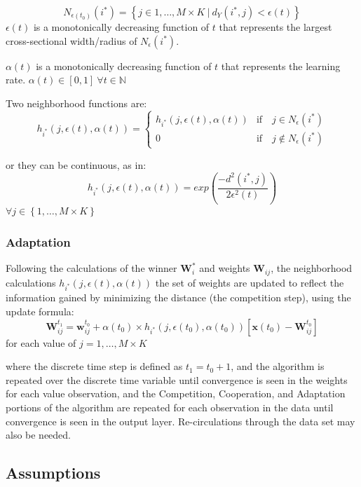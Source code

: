 \documentclass[12pt,]{article}
\begin{document}
\[N_{\epsilon(t_{0})}(i^{*})=\left \{ j \in 1, \ldots, M \times K \ | \  d_{Y}(i^{*}, j)<\epsilon(t) \right \}\]
\(\epsilon(t)\) is a monotonically decreasing function of \(t\) that
represents the largest cross-sectional width/radius of
\(N_{\epsilon}(i^{*})\).

\(\alpha(t)\) is a monotonically decreasing function of \(t\) that
represents the learning rate.
\(\alpha(t) \in [0,1] \ \forall t\in \mathbb{N}\)

Two neighborhood functions are: \[
h_{i^{*}}(j, \epsilon(t), \alpha(t))=
\begin{cases}
  h_{i^{*}}(j, \epsilon(t), \alpha(t)) & \text{if}  \quad j \in N_{\epsilon}(i^{*}) \\ 
  0 & \text{if} \quad   j  \notin N_{\epsilon}(i^{*}) 
\end{cases}
\]

or they can be continuous, as in:
\[h_{i^{*}}(j, \epsilon(t), \alpha(t)) = exp \left( \frac{-d^{2}(i^{*}, j)}{2\epsilon^{2}(t)} \right) \]
\(\forall j \in \left \{ 1, \ldots,M \times K\right \}\)

\hypertarget{adaptation}{%
\subsubsection{Adaptation}\label{adaptation}}

Following the calculations of the winner \(\mathbf{W}_{i}^{*}\) and
weights \(\mathbf{W}_{ij}\), the neighborhood calculations
\(h_{i^{*}}(j, \epsilon(t), \alpha(t))\) the set of weights are updated
to reflect the information gained by minimizing the distance (the
competition step), using the update formula:
\[\mathbf{W}_{ij}^{t_{1}} = \mathbf{w}_{ij}^{t_{0}} + \alpha(t_{0}) \times  h_{i^{*}}(j, \epsilon(t_{0}), \alpha(t_{0})) \left [ \mathbf{x}(t_{0})-\mathbf{W}_{ij}^{t_{0}}    \right ]\]
for each value of \(j=1, \ldots, M \times K\)

where the discrete time step is defined as \(t_{1} = t_{0} + 1\), and
the algorithm is repeated over the discrete time variable until
convergence is seen in the weights for each value observation, and the
Competition, Cooperation, and Adaptation portions of the algorithm are
repeated for each observation in the data until convergence is seen in
the output layer. Re-circulations through the data set may also be
needed.

\hypertarget{assumptions}{%
\subsection{Assumptions}\label{assumptions}}
\end{document}
